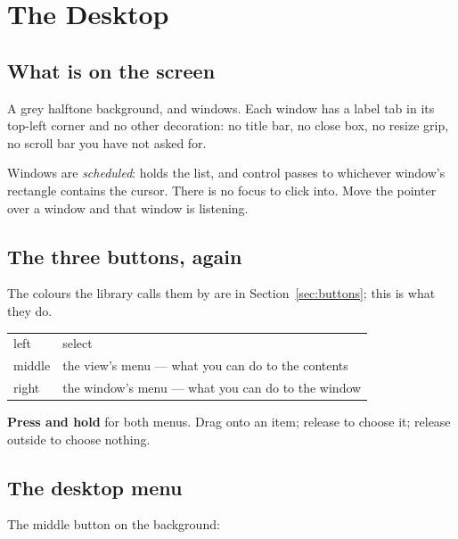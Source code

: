 \chapter{The Desktop}
\label{ch:desktop}


\section{What is on the screen}

A grey halftone background, and windows. Each window has a label tab in its
top-left corner and no other decoration: no title bar, no close box, no resize
grip, no scroll bar you have not asked for.

Windows are \emph{scheduled}:  holds the list, and
control passes to whichever window's rectangle contains the cursor. There is
no focus to click into. Move the pointer over a window and that window is
listening.

\section{The three buttons, again}

The colours the library calls them by are in Section~\ref{sec:buttons}; this
is what they do.

\begin{center}
\small
\begin{tabular}{@{}lp{}@{}}
\toprule
left & select\\
middle & the view's menu --- what you can do to the contents\\
right & the window's menu --- what you can do to the window\\
\bottomrule
\end{tabular}
\end{center}

\textbf{Press and hold} for both menus. Drag onto an item; release to choose
it; release outside to choose nothing.

\section{The desktop menu}

The middle button on the background:

